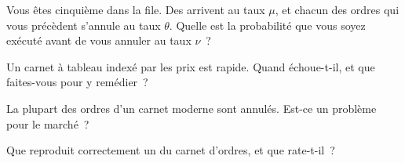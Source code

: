 \begin{interviewq}\label{iq:mx:the-limit-order-book:3}
Vous êtes cinquième dans la file. Des  arrivent au taux $\mu$, et chacun des ordres qui vous précèdent s'annule au taux $\theta$. Quelle est la probabilité que vous soyez exécuté avant de
vous annuler au taux $\nu$~?
\end{interviewq}

\begin{interviewq}\label{iq:mx:the-limit-order-book:4}
Un carnet à tableau indexé par les prix est rapide. Quand échoue-t-il, et que faites-vous pour y remédier~?
\end{interviewq}

\begin{interviewq}\label{iq:mx:the-limit-order-book:5}
La plupart des ordres d'un carnet moderne sont annulés. Est-ce un problème pour le marché~?
\end{interviewq}

\begin{interviewq}\label{iq:mx:the-limit-order-book:6}
Que reproduit correctement un  du carnet d'ordres, et que rate-t-il~?
\end{interviewq}
